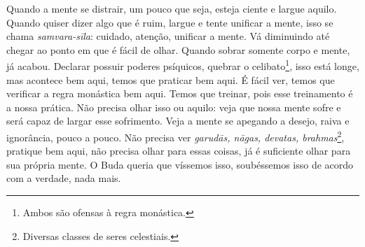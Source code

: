 Quando a mente se distrair, um pouco que seja, esteja ciente e
largue aquilo. Quando quiser dizer algo que é ruim, largue e tente
unificar a mente, isso se chama \textit{samvara-sīla}:\textit{
}cuidado, atenção, unificar a mente. Vá diminuindo até chegar ao ponto
em que é fácil de olhar. Quando sobrar somente corpo e mente, já
acabou. Declarar possuir poderes psíquicos, quebrar o
celibato\footnote{Ambos são ofensas à regra monástica.}, isso está
longe, mas acontece bem aqui, temos que praticar bem aqui. É fácil ver,
temos que verificar a regra monástica bem aqui. Temos que treinar, pois
esse treinamento é a nossa prática. Não precisa olhar isso ou aquilo:
veja que nossa mente sofre e será capaz de largar esse sofrimento. Veja
a mente se apegando a desejo, raiva e ignorância, pouco a pouco. Não
precisa ver \textit{garudās, nāgas, devatas,
brahmas}\footnote{Diversas classes de seres celestiais.}, pratique bem
aqui, não precisa olhar para essas coisas, já é suficiente olhar para
sua própria mente. O Buda queria que víssemos isso, soubéssemos isso de
acordo com a verdade, nada mais.
